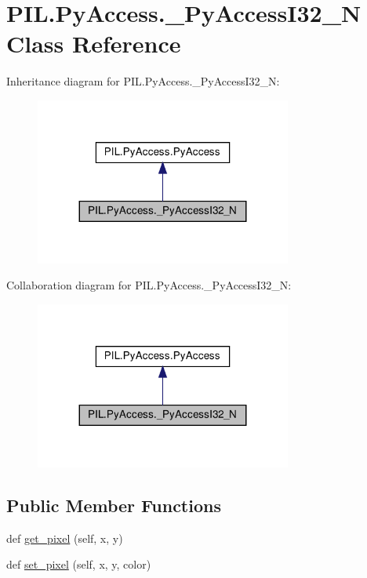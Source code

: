 \hypertarget{classPIL_1_1PyAccess_1_1__PyAccessI32__N}{}\section{P\+I\+L.\+Py\+Access.\+\_\+\+Py\+Access\+I32\+\_\+N Class Reference}
\label{classPIL_1_1PyAccess_1_1__PyAccessI32__N}


Inheritance diagram for P\+I\+L.\+Py\+Access.\+\_\+\+Py\+Access\+I32\+\_\+N\+:
\nopagebreak
\begin{figure}[H]
\begin{center}
\leavevmode
\includegraphics[width=239pt]{classPIL_1_1PyAccess_1_1__PyAccessI32__N__inherit__graph}
\end{center}
\end{figure}


Collaboration diagram for P\+I\+L.\+Py\+Access.\+\_\+\+Py\+Access\+I32\+\_\+N\+:
\nopagebreak
\begin{figure}[H]
\begin{center}
\leavevmode
\includegraphics[width=239pt]{classPIL_1_1PyAccess_1_1__PyAccessI32__N__coll__graph}
\end{center}
\end{figure}
\subsection*{Public Member Functions}
\begin{DoxyCompactItemize}
\item 
def \hyperlink{classPIL_1_1PyAccess_1_1__PyAccessI32__N_a9e694c1ba6c7a408f53ea2b6ae780a97}{get\+\_\+pixel} (self, x, y)
\item 
def \hyperlink{classPIL_1_1PyAccess_1_1__PyAccessI32__N_a2bc6011c35c493ab0a4fcccc7f9dc4d6}{set\+\_\+pixel} (self, x, y, color)
\end{DoxyCompactItemize}
